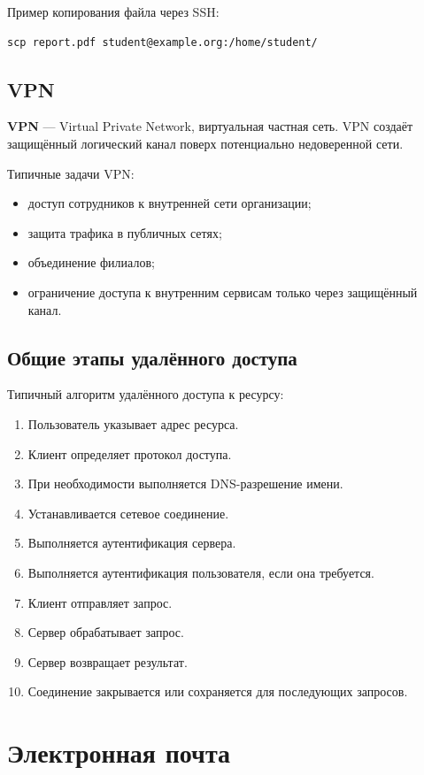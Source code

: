 \documentclass[12pt,a4paper]{article}
\begin{document}
Пример копирования файла через SSH:
\begin{lstlisting}
scp report.pdf student@example.org:/home/student/
\end{lstlisting}

\subsection{VPN}

\textbf{VPN} --- Virtual Private Network, виртуальная частная сеть. VPN создаёт защищённый логический канал поверх потенциально недоверенной сети.

Типичные задачи VPN:
\begin{itemize}
    \item доступ сотрудников к внутренней сети организации;
    \item защита трафика в публичных сетях;
    \item объединение филиалов;
    \item ограничение доступа к внутренним сервисам только через защищённый канал.
\end{itemize}

\subsection{Общие этапы удалённого доступа}

Типичный алгоритм удалённого доступа к ресурсу:
\begin{enumerate}
    \item Пользователь указывает адрес ресурса.
    \item Клиент определяет протокол доступа.
    \item При необходимости выполняется DNS-разрешение имени.
    \item Устанавливается сетевое соединение.
    \item Выполняется аутентификация сервера.
    \item Выполняется аутентификация пользователя, если она требуется.
    \item Клиент отправляет запрос.
    \item Сервер обрабатывает запрос.
    \item Сервер возвращает результат.
    \item Соединение закрывается или сохраняется для последующих запросов.
\end{enumerate}

\section{Электронная почта}
\end{document}
